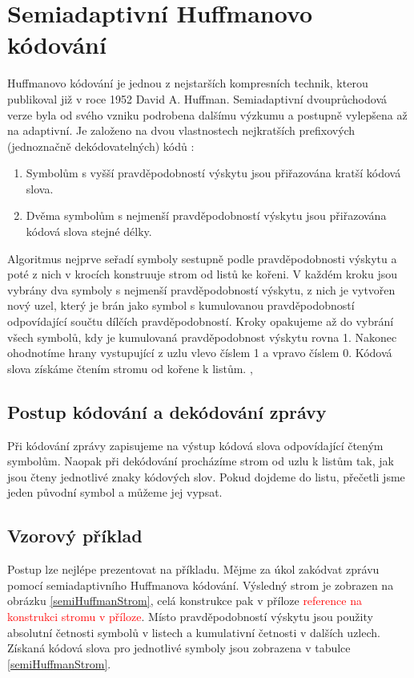 \section{Semiadaptivní Huffmanovo kódování}
\label{huffmanovoKodovani}
Huffmanovo kódování je jednou z nejstarších kompresních technik, kterou publikoval již v roce 1952 David A. Huffman. Semiadaptivní dvouprůchodová verze byla od svého vzniku podrobena dalšímu výzkumu a postupně vylepšena až na adaptivní. Je založeno na dvou vlastnostech nejkratších prefixových (jednoznačně dekódovatelných) kódů \cite{introductionToDataCompression}:

\begin{enumerate}
\item Symbolům s vyšší pravděpodobností výskytu jsou přiřazována kratší kódová slova.
\item Dvěma symbolům s nejmenší pravděpodobností výskytu jsou přiřazována kódová slova stejné délky.
\end{enumerate}

Algoritmus nejprve seřadí symboly sestupně podle pravděpodobnosti výskytu a poté z nich v krocích konstruuje strom od listů ke kořeni. V každém kroku jsou vybrány dva symboly s nejmenší pravděpodobností výskytu, z nich je vytvořen nový uzel, který je brán jako symbol s kumulovanou pravděpodobností odpovídající součtu dílčích pravděpodobností. Kroky opakujeme až do vybrání všech symbolů, kdy je kumulovaná pravděpodobnost výskytu rovna 1. Nakonec ohodnotíme hrany vystupující z uzlu vlevo číslem 1 a vpravo číslem 0. Kódová slova získáme čtením stromu od kořene k listům. \cite{dataCompression}, \cite{introductionToDataCompression}

\subsection{Postup kódování a dekódování zprávy}
Při kódování zprávy zapisujeme na výstup kódová slova odpovídající čteným symbolům. Naopak při dekódování procházíme strom od uzlu k listům tak, jak jsou čteny jednotlivé znaky kódových slov. Pokud dojdeme do listu, přečetli jsme jeden původní symbol a můžeme jej vypsat.

\subsection{Vzorový příklad}
Postup lze nejlépe prezentovat na příkladu. Mějme za úkol zakódvat zprávu  pomocí semiadaptivního Huffmanova kódování. Výsledný strom je zobrazen na obrázku \ref{semiHuffmanStrom}, celá konstrukce pak v příloze \textcolor{red}{reference na konstrukci stromu v příloze}. Místo pravděpodobností výskytu jsou použity absolutní četnosti symbolů v listech a kumulativní četnosti v dalších uzlech. Získaná kódová slova pro jednotlivé symboly jsou zobrazena v tabulce \ref{semiHuffmanStrom}.

